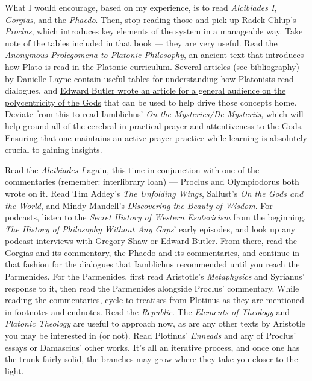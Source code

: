 \documentclass[
]{book}
\begin{document}
What I would encourage, based on my experience, is to read \emph{Alcibiades I}, \emph{Gorgias}, and the \emph{Phaedo}. Then, stop reading those and pick up Radek Chlup's \emph{Proclus}, which introduces key elements of the system in a manageable way. Take note of the tables included in that book --- they are very useful. Read the \emph{Anonymous Prolegomena to Platonic Philosophy}, an ancient text that introduces how Plato is read in the Platonic curriculum. Several articles (see bibliography) by Danielle Layne contain useful tables for understanding how Platonists read dialogues, and \href{https://www.academia.edu/30296722/_Polycentric_Polytheism_pp._37-40_in_Witches_and_Pagans_32_June_2016}{Edward Butler wrote an article for a general audience on the polycentricity of the Gods} that can be used to help drive those concepts home. Deviate from this to read Iamblichus' \emph{On the Mysteries/De Mysteriis}, which will help ground all of the cerebral in practical prayer and attentiveness to the Gods. Ensuring that one maintains an active prayer practice while learning is absolutely crucial to gaining insights.

Read the \emph{Alcibiades I} again, this time in conjunction with one of the commentaries (remember: interlibrary loan) --- Proclus and Olympiodorus both wrote on it. Read Tim Addey's \emph{The Unfolding Wings}, Sallust's \emph{On the Gods and the World}, and Mindy Mandell's \emph{Discovering the Beauty of Wisdom}. For podcasts, listen to the \emph{Secret History of Western Esotericism} from the beginning, \emph{The History of Philosophy Without Any Gaps}' early episodes, and look up any podcast interviews with Gregory Shaw or Edward Butler. From there, read the Gorgias and its commentary, the Phaedo and its commentaries, and continue in that fashion for the dialogues that Iamblichus recommended until you reach the Parmenides. For the Parmenides, first read Aristotle's \emph{Metaphysics} and Syrianus' response to it, then read the Parmenides alongside Proclus' commentary. While reading the commentaries, cycle to treatises from Plotinus as they are mentioned in footnotes and endnotes. Read the \emph{Republic}. The \emph{Elements of Theology} and \emph{Platonic Theology} are useful to approach now, as are any other texts by Aristotle you may be interested in (or not). Read Plotinus' \emph{Enneads} and any of Proclus' essays or Damascius' other works. It's all an iterative process, and once one has the trunk fairly solid, the branches may grow where they take you closer to the light.
\end{document}
